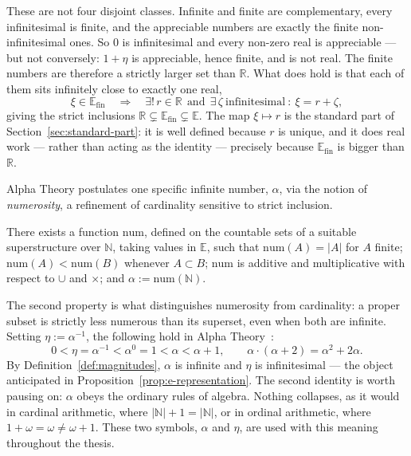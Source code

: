 These are not four disjoint classes. Infinite and finite are complementary, every
infinitesimal is finite, and the appreciable numbers are exactly the finite
non-infinitesimal ones. So $0$ is infinitesimal and every non-zero real is
appreciable --- but not conversely: $1+\eta$ is appreciable, hence finite, and is not
real. The finite numbers are therefore a strictly larger set than $\mathbb{R}$. What
does hold is that each of them sits infinitely close to exactly one real,
\begin{equation}
  \label{eq:finite-decomposition}
  \xi \in \mathbb{E}_{\mathrm{fin}}
  \quad\Longrightarrow\quad
  \exists!\, r \in \mathbb{R} \ \ \text{and} \ \ \exists\, \zeta \ \text{infinitesimal}
  \ : \ \xi = r + \zeta ,
\end{equation}
giving the strict inclusions
$\mathbb{R} \subsetneq \mathbb{E}_{\mathrm{fin}} \subsetneq \mathbb{E}$. The map
$\xi \mapsto r$ is the standard part of Section~\ref{sec:standard-part}: it is well
defined because $r$ is unique, and it does real work --- rather than acting as the
identity --- precisely because $\mathbb{E}_{\mathrm{fin}}$ is bigger than
$\mathbb{R}$.

Alpha Theory postulates one specific infinite number, $\alpha$, via the notion of
\emph{numerosity}, a refinement of cardinality sensitive to strict inclusion.

\begin{axiom}
\label{ax:num}
There exists a function $\mathrm{num}$, defined on the countable sets of a suitable
superstructure over $\mathbb{N}$, taking values in $\mathbb{E}$, such that
$\mathrm{num}(A) = |A|$ for $A$ finite; $\mathrm{num}(A) < \mathrm{num}(B)$ whenever
$A \subset B$; $\mathrm{num}$ is additive and multiplicative with respect to
$\cup$ and $\times$; and $\alpha := \mathrm{num}(\mathbb{N})$.
\end{axiom}

The second property is what distinguishes numerosity from cardinality: a proper
subset is strictly less numerous than its superset, even when both are infinite.
Setting $\eta := \alpha^{-1}$, the following hold in Alpha
Theory~\cite{benci2022nonstandard}:
\[
  0 < \eta = \alpha^{-1} < \alpha^{0} = 1 < \alpha < \alpha+1,
  \qquad
  \alpha \cdot (\alpha + 2) = \alpha^{2} + 2\alpha.
\]
By Definition~\ref{def:magnitudes}, $\alpha$ is infinite and $\eta$ is
infinitesimal --- the object anticipated in Proposition~\ref{prop:e-representation}.
The second identity is worth pausing on: $\alpha$ obeys the ordinary rules of algebra.
Nothing collapses, as it would in cardinal arithmetic, where
$|\mathbb{N}|+1 = |\mathbb{N}|$, or in ordinal arithmetic, where
$1+\omega = \omega \ne \omega+1$. These two symbols, $\alpha$ and $\eta$, are used
with this meaning throughout the thesis.

